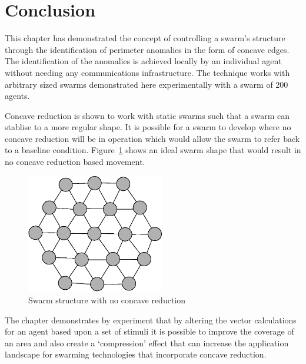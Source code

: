 \section{Conclusion}\label{voids:Conclusion}
This chapter has demonstrated the concept of controlling a swarm's structure through the identification of perimeter anomalies in the form of concave edges. The identification of the anomalies is achieved locally by an individual agent without needing any communications infrastructure. The technique works with arbitrary sized swarms demonstrated here experimentally with a swarm of 200 agents.

Concave reduction is shown to work with static swarms such that a swarm can stablise to a more regular shape. It is possible for a swarm to develop where no concave reduction will be in operation which would allow the swarm to refer back to a baseline condition. Figure~\ref{voids:IdealSwarm} shows an ideal swarm shape that would result in no concave reduction based movement. 

\begin{figure}[H]
\begin{center}
\includegraphics[width=6cm]{CHAPTER-7/figures/IdealSwarm}
\end{center}
\caption{Swarm structure with no concave reduction\label{voids:IdealSwarm}}
\end{figure}

The chapter demonstrates by experiment that by altering the vector calculations for an agent based upon a set of stimuli it is possible to improve the coverage of an area and also create a `compression' effect that can increase the application landscape for swarming technologies that incorporate concave reduction.
